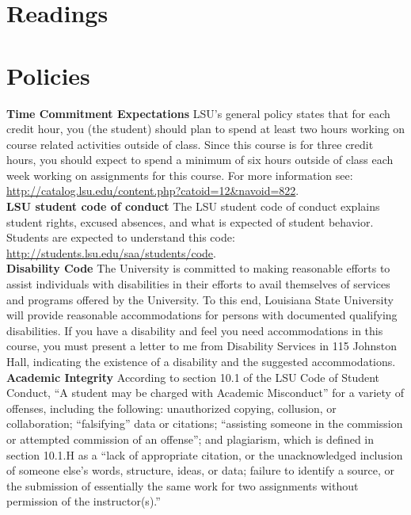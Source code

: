 \documentclass[11pt,article,oneside]{memoir}
\begin{document}
\clearpage

\section{Readings}
\vspace*{0.5cm}
\nocite{*}
\setlength{}
\printbibliography[heading=none]
\clearpage
\section{Policies}

\noindent \textbf{Time Commitment Expectations}
LSU's general policy states that for each credit hour, you (the student) should plan to
spend at least two hours working on course related activities outside of class. Since this course is for three credit hours, you should expect to spend a minimum of six hours outside of class each week working on assignments for this course. For more information see: 
\url{http://catalog.lsu.edu/content.php?catoid=12&navoid=822}.\\

\noindent \textbf{LSU student code of conduct}
The LSU student code of conduct explains student rights, excused absences, and what is expected of student behavior. Students are expected to understand this code:  \url{http://students.lsu.edu/saa/students/code}.\\ %

\noindent \textbf{Disability Code}
The University is committed to making reasonable efforts to assist individuals with disabilities in
their efforts to avail themselves of services and programs offered by the University. To this end,
Louisiana State University will provide reasonable accommodations for persons with
documented qualifying disabilities. If you have a disability and feel you need accommodations in
this course, you must present a letter to me from Disability Services in 115 Johnston Hall,
indicating the existence of a disability and the suggested accommodations.\\

\noindent \textbf{Academic Integrity}
According to section 10.1 of the LSU Code of Student Conduct, ``A student may be charged with Academic Misconduct'' for a variety of offenses, including the following: unauthorized copying, collusion, or collaboration; ``falsifying'' data or citations; ``assisting someone in the commission or attempted commission of an offense''; and plagiarism, which is defined in section 10.1.H as a ``lack of appropriate citation, or the unacknowledged inclusion of someone else's words, structure, ideas, or data; failure to identify a source, or the submission of essentially the same work for two assignments without permission of the instructor(s).''\\
\end{document}
